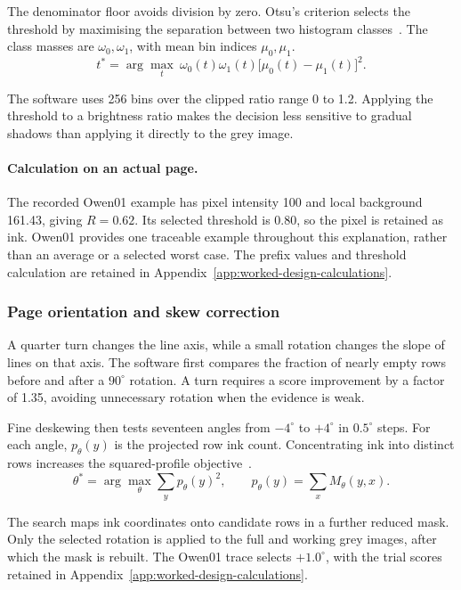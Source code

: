The denominator floor avoids division by zero. Otsu's criterion selects the threshold by maximising the separation between two histogram classes~\cite{otsu1979}. The class masses are $\omega_0,\omega_1$, with mean bin indices $\mu_0,\mu_1$.
\begin{equation}
t^*=\arg\max_t\ \omega_0(t)\omega_1(t)
\bigl[\mu_0(t)-\mu_1(t)\bigr]^2.
\label{eq:des-otsu}
\end{equation}

The software uses 256 bins over the clipped ratio range 0 to 1.2. Applying the threshold to a brightness ratio makes the decision less sensitive to gradual shadows than applying it directly to the grey image.

\paragraph{Calculation on an actual page.}
The recorded Owen01 example has pixel intensity 100 and local background 161.43, giving $R=0.62$. Its selected threshold is 0.80, so the pixel is retained as ink. Owen01 provides one traceable example throughout this explanation, rather than an average or a selected worst case. The prefix values and threshold calculation are retained in Appendix~\ref{app:worked-design-calculations}.

\subsubsection{Page orientation and skew correction}
A quarter turn changes the line axis, while a small rotation changes the slope of lines on that axis. The software first compares the fraction of nearly empty rows before and after a $90^\circ$ rotation. A turn requires a score improvement by a factor of 1.35, avoiding unnecessary rotation when the evidence is weak.

Fine deskewing then tests seventeen angles from $-4^\circ$ to $+4^\circ$ in $0.5^\circ$ steps. For each angle, $p_\theta(y)$ is the projected row ink count. Concentrating ink into distinct rows increases the squared-profile objective~\cite{postl1986}.
\begin{equation}
\theta^*=\arg\max_\theta\sum_y p_\theta(y)^2,\qquad
p_\theta(y)=\sum_x M_\theta(y,x).
\label{eq:des-skew}
\end{equation}

The search maps ink coordinates onto candidate rows in a further reduced mask. Only the selected rotation is applied to the full and working grey images, after which the mask is rebuilt. The Owen01 trace selects $+1.0^\circ$, with the trial scores retained in Appendix~\ref{app:worked-design-calculations}.

